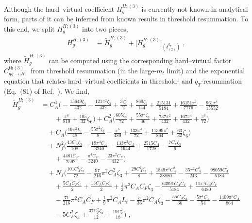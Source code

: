 \documentclass[12pt]{article}
\DeclareRobustCommand{\nn}{\nonumber}
\DeclareRobustCommand{\qt}{\ensuremath{q_T}\xspace}
\begin{document}
Although the hard--virtual coefficient $H^{H;(3)}_{g}$ is currently not known in analytical form, parts of it can be inferred from known results in threshold resummation.
To this end, we split $H^{H;(3)}_{g}$ into two pieces,
\begin{align}
  H^{H;(3)}_g  
  &\equiv  
  \widetilde{H}^{H;(3)}_{g} + \big[H^{H;(3)}_{g}\big]_{(\delta^{\qt}_{(2)})} \;,
  \label{H3deltaqT2}
\end{align}
where $\widetilde{H}^{H;(3)}_{g}$ can be computed using the corresponding hard--virtual factor $C^{\mathrm{th}(3)}_{gg\to H}$~\cite{Catani:2014uta} from threshold resummation (in the large-$m_t$ limit) and the exponential equation that relates hard--virtual coefficients in threshold- and $\qt$-resummation (Eq.~(81) of Ref.~\cite{Catani:2013tia}). We find,
\begin{align}
  \widetilde{H}^{H;(3)}_{g}
  &=
  C_{A}^{3} \biggl(
    -\frac{15649 \zeta_{3}}{432}
    -\frac{121 \pi ^2 \zeta_{3}}{432}
    +\frac{3\zeta_{3}^2}{2}
    +\frac{869 \zeta_{ 5}}{144}
    +\frac{215131}{5184}
    +\frac{16151 \pi ^2}{7776}
    -\frac{961\pi ^4}{15552}
    \nn\\&\qquad
    +\frac{\pi ^6}{810}
    +\frac{105}{32} \zeta_{6}
  \biggr)
  + C_{A}^{2} \biggl(
    \frac{605 \zeta_{ 3}}{72}
    +\frac{55 \pi ^2 \zeta_{ 3}}{36}
    +\frac{737 \pi ^2}{432}
    +\frac{167 \pi ^4}{432}
    +\frac{\pi^6}{72}
  \biggr) 
  \nn\\&\quad
  + C_{A} \biggl( 
    \frac{19 \pi ^2  L_{t}}{48}
    -\frac{55 \pi ^2 \zeta _{3}}{8}
    -\frac{\pi ^6}{480}
    +\frac{133 \pi ^4}{72}
    +\frac{11399\pi ^2}{864}  
    +\frac{63}{32} \zeta_{6}
  \biggr)
  \nn\\&\quad
  + N_{f}^{2} \biggl( 
    \frac{43 C_{A} \zeta_{ 3}}{108}
    -\frac{19 \pi ^4 C_{A}}{3240}
    -\frac{133 \pi ^2 C_{A}}{1944}
    +\frac{2515C_{A}}{1728}
    -\frac{7 C_{F} \zeta_{ 3}}{6}
    \nn\\&\qquad
    +\frac{4481 C_{F}}{2592}
    -\frac{\pi ^4C_{F}}{3240}
    -\frac{23 \pi ^2 C_{F}}{432} 
  \biggr)
  \nn\\&\quad
  + N_{f} \biggl(
    \frac{101 C_{A}^2 \zeta_{5}}{72}
    -\frac{97}{216} \pi ^2 C_{A}^2 \zeta_{3}
    +\frac{29 C_{A}^2 \zeta_{3}}{8}
    +\frac{1849 \pi ^4 C_{A}^2}{38880}
    -\frac{35 \pi ^2 C_{A}^2}{243}
    -\frac{98059C_{A}^2}{5184}
    \nn\\&\qquad
    +\frac{5 C_{A} C_{F} \zeta _{5}}{2}
    +\frac{13 C_{A} C_{F} \zeta_{3}}{2}
    +\frac{1}{2} \pi ^2 C_{A} C_{F} \zeta _{3}
    -\frac{63991 C_{A} C_{F}}{5184}
    +\frac{11 \pi ^4C_{A} C_{F}}{6480}
    \nn\\&\qquad
    -\frac{71}{216} \pi ^2 C_{A} C_{F}
    +\frac{1}{9} \pi ^2 C_{A}L_{t}
    -\frac{5}{36} \pi ^2 C_{A} \zeta _{3}
    -\frac{55 C_{A} \zeta_{ 3}}{36}
    -\frac{5 \pi ^4C_{A}}{54}
    -\frac{1409 \pi ^2 C_{A}}{864}
    \nn\\&\qquad
    -5 C_{F}^2 \zeta_{ 5}
    +\frac{37 C_{F}^2 \zeta_{3}}{12}
    +\frac{19 C_{F}^2}{18}
  \biggr) \;,
  \label{H3approx}
\end{align}
\end{document}
